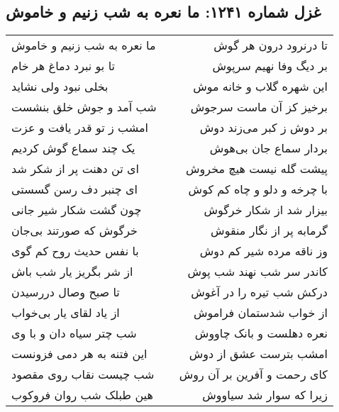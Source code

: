 \begin{center}
\section*{غزل شماره ۱۲۴۱: ما نعره به شب زنیم و خاموش}
\label{sec:1241}
\begin{longtable}{l p{0.5cm} r}
ما نعره به شب زنیم و خاموش
&&
تا درنرود درون هر گوش
\\
تا بو نبرد دماغ هر خام
&&
بر دیگ وفا نهیم سرپوش
\\
بخلی نبود ولی نشاید
&&
این شهره گلاب و خانه موش
\\
شب آمد و جوش خلق بنشست
&&
برخیز کز آن ماست سرجوش
\\
امشب ز تو قدر یافت و عزت
&&
بر دوش ز کبر می‌زند دوش
\\
یک چند سماع گوش کردیم
&&
بردار سماع جان بی‌هوش
\\
ای تن دهنت پر از شکر شد
&&
پیشت گله نیست هیچ مخروش
\\
ای چنبر دف رسن گسستی
&&
با چرخه و دلو و چاه کم کوش
\\
چون گشت شکار شیر جانی
&&
بیزار شد از شکار خرگوش
\\
خرگوش که صورتند بی‌جان
&&
گرمابه پر از نگار منقوش
\\
با نفس حدیث روح کم گوی
&&
وز ناقه مرده شیر کم دوش
\\
از شر بگریز یار شب باش
&&
کاندر سر شب نهند شب پوش
\\
تا صبح وصال دررسیدن
&&
درکش شب تیره را در آغوش
\\
از یاد لقای یار بی‌خواب
&&
از خواب شدستمان فراموش
\\
شب چتر سیاه دان و با وی
&&
نعره دهلست و بانک چاووش
\\
این فتنه به هر دمی فزونست
&&
امشب بترست عشق از دوش
\\
شب چیست نقاب روی مقصود
&&
کای رحمت و آفرین بر آن روش
\\
هین طبلک شب روان فروکوب
&&
زیرا که سوار شد سیاووش
\\
\end{longtable}
\end{center}

